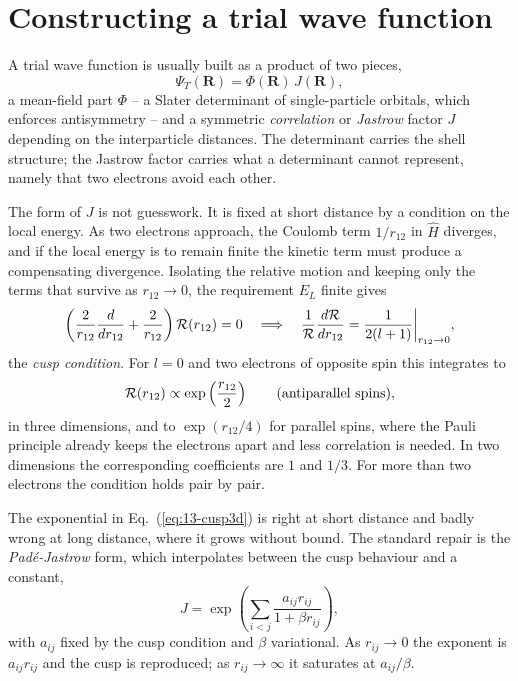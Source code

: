 \section{Constructing a trial wave function}
\label{sec:vmctrial}

A trial wave function is usually built as a product of two pieces,
\begin{equation}
  \Psi_T(\bm{R}) = \Phi(\bm{R})\,J(\bm{R}),
  \label{eq:13-productansatz}
\end{equation}
a mean-field part $\Phi$ -- a Slater determinant of single-particle orbitals,
which enforces antisymmetry -- and a symmetric \emph{correlation} or
\emph{Jastrow} factor $J$ depending on the interparticle distances.  The
determinant carries the shell structure; the Jastrow factor carries what a
determinant cannot represent, namely that two electrons avoid each other.

The form of $J$ is not guesswork.  It is fixed at short distance by a
condition on the local energy.  As two electrons approach, the Coulomb term
$1/r_{12}$ in $\hat{H}$ diverges, and if the local energy is to remain finite
the kinetic term must produce a compensating divergence.  Isolating the
relative motion and keeping only the terms that survive as $r_{12}\to0$, the
requirement $E_L$ finite gives
\begin{equation}
  \left(\frac{2}{r_{12}}\frac{d}{dr_{12}}
   + \frac{2}{r_{12}}\right){\cal R}(r_{12}) = 0
  \quad\Longrightarrow\quad
  \frac{1}{{\cal R}}\frac{d{\cal R}}{dr_{12}}
   = \frac{1}{2(l+1)}\bigg|_{r_{12}\to0},
  \label{eq:13-cuspderivation}
\end{equation}
the \emph{cusp condition}.  For $l=0$ and two electrons of opposite spin this
integrates to
\begin{equation}
  {\cal R}(r_{12}) \propto \exp\left(\frac{r_{12}}{2}\right)
  \qquad\text{(antiparallel spins)},
  \label{eq:13-cusp3d}
\end{equation}
in three dimensions, and to $\exp(r_{12}/4)$ for parallel spins, where the
Pauli principle already keeps the electrons apart and less correlation is
needed.  In two dimensions the corresponding coefficients are $1$ and
$1/3$.  For more than two electrons the condition holds pair by pair.

The exponential in Eq.~(\ref{eq:13-cusp3d}) is right at short distance and
badly wrong at long distance, where it grows without bound.  The standard
repair is the \emph{Pad\'e-Jastrow} form, which interpolates between the cusp
behaviour and a constant,
\begin{equation}
  J = \exp\left(\sum_{i<j}\frac{a_{ij}r_{ij}}{1+\beta r_{ij}}\right),
  \label{eq:13-padejastrow}
\end{equation}
with $a_{ij}$ fixed by the cusp condition and $\beta$ variational.  As
$r_{ij}\to0$ the exponent is $a_{ij}r_{ij}$ and the cusp is reproduced; as
$r_{ij}\to\infty$ it saturates at $a_{ij}/\beta$.

